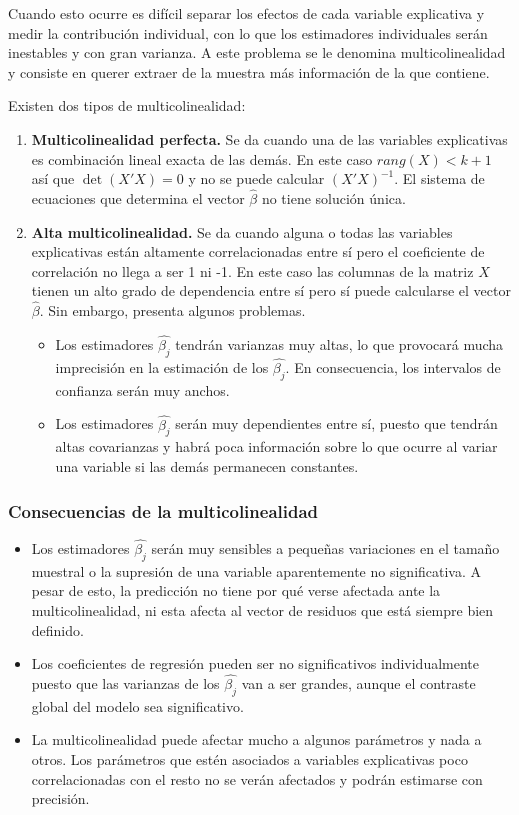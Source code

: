 \documentclass{report}
\theoremstyle{remark}
\theoremstyle{remark}
\theoremstyle{remark}
\theoremstyle{definition}
\theoremstyle{definition}
\theoremstyle{definition}
\begin{document}
Cuando esto ocurre es difícil separar los efectos de cada variable explicativa y medir la contribución individual, con lo que los estimadores individuales serán inestables y con gran varianza.
A este problema se le denomina multicolinealidad y consiste en querer extraer de la muestra más información de la que contiene.

Existen dos tipos de multicolinealidad:
\begin{enumerate}
    \item \textbf{Multicolinealidad perfecta.}
          Se da cuando una de las variables explicativas es combinación lineal exacta de las demás.
          En este caso $rang(X) < k+1$ así que $\det(X'X) = 0$ y no se puede calcular $(X'X)^{-1}$.
          El sistema de ecuaciones que determina el vector $\hat{\beta}$ no tiene solución única.
    \item \textbf{Alta multicolinealidad.}
          Se da cuando alguna o todas las variables explicativas están altamente correlacionadas entre sí pero el coeficiente de correlación no llega a ser 1 ni -1.
          En este caso las columnas de la matriz $X$ tienen un alto grado de dependencia entre sí pero sí puede calcularse el vector $\hat{\beta}$.
          Sin embargo, presenta algunos problemas.
          \begin{itemize}
              \item Los estimadores $\hat{\beta_j}$ tendrán varianzas muy altas, lo que provocará mucha imprecisión en la estimación de los $\hat{\beta_j}$.
                    En consecuencia, los intervalos de confianza serán muy anchos.
              \item Los estimadores $\hat{\beta_j}$ serán muy dependientes entre sí, puesto que tendrán altas covarianzas y habrá poca información sobre lo que ocurre al variar una variable si las demás permanecen constantes.
          \end{itemize}
\end{enumerate}

\subsubsection*{Consecuencias de la multicolinealidad}
\begin{itemize}
    \item Los estimadores $\hat{\beta_j}$ serán muy sensibles a pequeñas variaciones en el tamaño muestral o la supresión de una variable aparentemente no significativa.
          A pesar de esto, la predicción no tiene por qué verse afectada ante la multicolinealidad, ni esta afecta al vector de residuos que está siempre bien definido.
    \item Los coeficientes de regresión pueden ser no significativos individualmente puesto que las varianzas de los $\hat{\beta_j}$ van a ser grandes, aunque el contraste global del modelo sea significativo.
    \item La multicolinealidad puede afectar mucho a algunos parámetros y nada a otros.
          Los parámetros que estén asociados a variables explicativas poco correlacionadas con el resto no se verán afectados y podrán estimarse con precisión.
\end{itemize}
\end{document}
